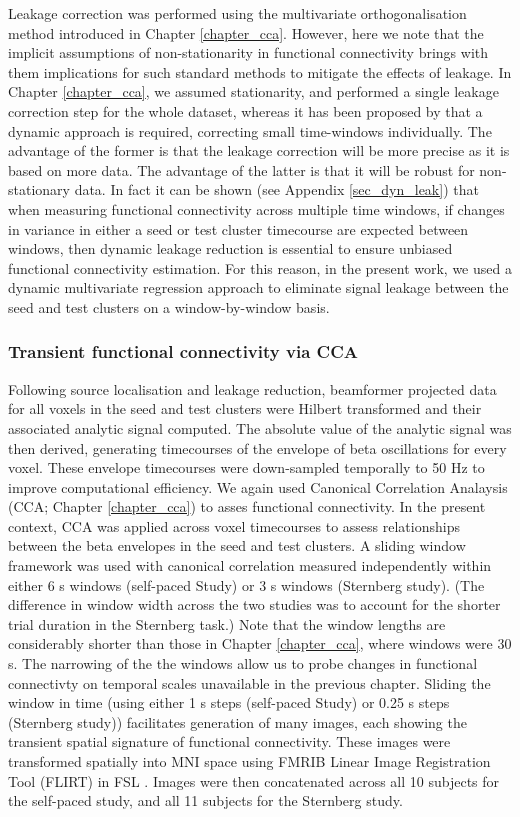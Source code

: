 Leakage correction was performed using the multivariate orthogonalisation method introduced in Chapter \ref{chapter_cca}. However, here we note that the implicit assumptions of non-stationarity in functional connectivity brings with them implications for such standard methods to mitigate the effects of leakage. In Chapter \ref{chapter_cca}, we assumed stationarity, and performed a single leakage correction step for the whole dataset, whereas it has been proposed  by \cite{Hipp2012} that a dynamic approach is required, correcting small time-windows individually. The advantage of the former is that the leakage correction will be more precise as it is based on more data. The advantage of the latter is that it will be robust for non-stationary data. In fact it can be shown (see Appendix \ref{sec_dyn_leak}) that when measuring functional connectivity across multiple time windows, if changes in variance in either a seed or test cluster timecourse are expected between windows, then dynamic leakage reduction is essential to ensure unbiased functional connectivity estimation. For this reason, in the present work, we used a dynamic multivariate regression approach to eliminate signal leakage between the seed and test clusters on a window-by-window basis.

\subsubsection{Transient functional connectivity via CCA}
Following source localisation and leakage reduction, beamformer projected data for all voxels in the seed and test clusters were Hilbert transformed and their associated analytic signal computed. The absolute value of the analytic signal was then derived, generating timecourses of the envelope of beta oscillations for every voxel. These envelope timecourses were down-sampled temporally to 50 Hz to improve computational efficiency. We again used Canonical Correlation Analaysis (CCA; Chapter \ref{chapter_cca}) to asses functional connectivity. In the present context, CCA was applied across voxel timecourses to assess relationships between the beta envelopes in the seed and test clusters. A sliding window framework was used with canonical correlation measured independently within either 6 s windows (self-paced Study) or 3 s windows (Sternberg study). (The difference in window width across the two studies was to account for the shorter trial duration in the Sternberg task.) Note that the window lengths are considerably shorter than those in Chapter \ref{chapter_cca}, where windows were 30 s. The narrowing of the the windows allow us to probe changes in functional connectivty on temporal scales unavailable in the previous chapter. Sliding the window in time (using either 1 s steps (self-paced Study) or 0.25 s steps (Sternberg study)) facilitates generation of many images, each showing the transient spatial signature of functional connectivity. These images were transformed spatially into MNI space using FMRIB Linear  Image Registration Tool (FLIRT) in FSL \citep{Jenkinson2012}. Images were then concatenated across all 10 subjects for the self-paced study, and all 11 subjects for the Sternberg study.

